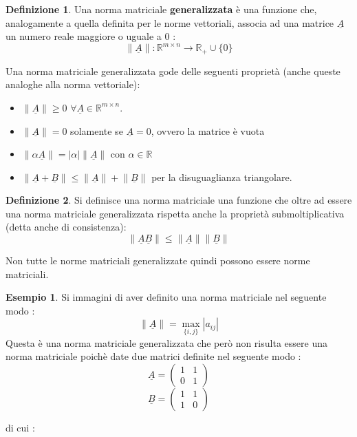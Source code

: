 \documentclass[12pt, a4paper]{book}
\theoremstyle{definition}
\newtheorem{exmp}{Esempio}[section]
\newtheorem{defn}{Definizione}[section]
\newcommand{\VarMtrx}[1]{\ensuremath{\underline{#1}}}
\begin{document}
\begin{flushleft}
\begin{defn}
Una norma matriciale \textbf{generalizzata} è una funzione che,  analogamente a quella definita per le norme vettoriali, associa ad una matrice \VarMtrx{A} un numero reale maggiore o uguale a 0 : 
\[ \lVert \VarMtrx{A} \rVert :  \mathbb{R}^{m \times n } \longrightarrow \mathbb{R}_{+} \cup \{0\} \]
\end{defn}
Una norma matriciale generalizzata  gode delle seguenti proprietà (anche queste analoghe alla norma vettoriale): 
\begin{itemize}
	\item $\lVert \VarMtrx{A} \rVert \geq 0$ $\forall \VarMtrx{A} \in \mathbb{R}^{m \times n}$.
	\item $\lVert \VarMtrx{A} \rVert = 0$ solamente se $\VarMtrx{A} = 0$, ovvero la matrice è vuota
	\item $\lVert\alpha \VarMtrx{A}\rVert = |\alpha|\lVert\VarMtrx{A}\rVert$ con $\alpha \in \mathbb{R}$
	\item $\lVert \VarMtrx{A} + \VarMtrx{B}\rVert \leq \lVert \VarMtrx{A}\rVert + \lVert\VarMtrx{B}\rVert$ per la disuguaglianza triangolare.
\end{itemize}

\begin{defn}
Si definisce una norma matriciale una funzione che oltre ad essere una norma matriciale generalizzata rispetta anche la proprietà submoltiplicativa (detta anche di consistenza):
\[ \lVert \VarMtrx{A}\VarMtrx{B}\rVert \leq \lVert \VarMtrx{A}\rVert\lVert\VarMtrx{B}\rVert \]
\end{defn}

Non tutte le norme matriciali generalizzate quindi possono essere norme matriciali. 
\begin{exmp}
Si immagini di aver definito una norma matriciale nel seguente modo : 
\[ \lVert\VarMtrx{A}\rVert = \max_{\{i,j\}} |a_{ij}| \]
Questa è una norma matriciale generalizzata che però non risulta essere una norma matriciale poichè date due matrici definite nel seguente modo : 
\[ 
	\VarMtrx{A} = \begin{pmatrix} 1 & 1 \\ 0 & 1  \end{pmatrix} 
\]
\[ 
	\VarMtrx{B} = \begin{pmatrix} 1 & 1 \\ 1 & 0  \end{pmatrix} 
\]

di cui : 


\end{exmp}
\end{flushleft}
\end{document}
